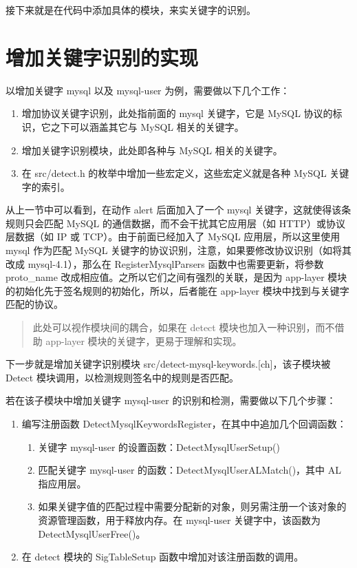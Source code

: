 接下来就是在代码中添加具体的模块，来实关键字的识别。

\section{增加关键字识别的实现}
以增加关键字 {\cf mysql} 以及 {\cf mysql-user} 为例，需要做以下几个工作：
\begin{enumerate}
    \item 增加协议关键字识别，此处指前面的 {\cf mysql} 关键字，它是 MySQL 协议的标识，它之下可以涵盖其它与 MySQL 相关的关键字。
	\item 增加关键字识别模块，此处即各种与 MySQL 相关的关键字。
    \item 在 {\ff src/detect.h} 的枚举中增加一些宏定义，这些宏定义就是各种 MySQL 关键字的索引。
\end{enumerate}

从上一节中可以看到，在动作 {\cf alert} 后面加入了一个 {\cf mysql} 关键字，这就使得该条规则只会匹配 MySQL 的通信数据，而不会干扰其它应用层（如 HTTP）或协议层数据（如 IP 或 TCP）。由于前面已经加入了 MySQL 应用层，所以这里使用 {\cf mysql} 作为匹配 MySQL 关键字的协议识别，注意，如果要修改协议识别（如将其改成 {\cf mysql-4.1}），那么在 {\cf RegisterMysqlParsers} 函数中也需要更新，将参数 {\cf proto\_name} 改成相应值。之所以它们之间有强烈的关联，是因为 {\cf app-layer} 模块的初始化先于签名规则的初始化，所以，后者能在 {\cf app-layer} 模块中找到与关键字匹配的协议。

\begin{quote}
    此处可以视作模块间的耦合，如果在 detect 模块也加入一种识别，而不借助 app-layer 模块的关键字，更易于理解和实现。
\end{quote}

下一步就是增加关键字识别模块 {\ff src/detect-mysql-keywords.[ch]}，该子模块被 Detect 模块调用，以检测规则签名中的规则是否匹配。

若在该子模块中增加关键字 {\cf mysql-user} 的识别和检测，需要做以下几个步骤：

\begin{enumerate}
	\item 编写注册函数 {\cf DetectMysqlKeywordsRegister}，在其中中追加几个回调函数：
	\begin{enumerate}
		\item 关键字 {\cf mysql-user} 的设置函数：{\cf DetectMysqlUserSetup()}
		\item 匹配关键字 {\cf mysql-user} 的函数：{\cf DetectMysqlUserALMatch()}，其中 {\cf AL} 指应用层。
		\item 如果关键字值的匹配过程中需要分配新的对象，则另需注册一个该对象的资源管理函数，用于释放内存。在 {\cf mysql-user} 关键字中，该函数为 {\cf DetectMysqlUserFree()}。
	\end{enumerate}
    \item 在 detect 模块的 {\cf SigTableSetup} 函数中增加对该注册函数的调用。
\end{enumerate}

